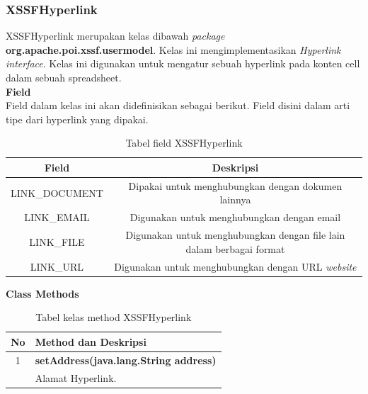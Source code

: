 \subsubsection{XSSFHyperlink}
\label{subs:XSSFHyperlink}
XSSFHyperlink merupakan kelas dibawah \textit{package} \textbf{org.apache.poi.xssf.usermodel}. Kelas ini mengimplementasikan \textit{Hyperlink interface}. Kelas ini digunakan untuk mengatur sebuah hyperlink pada konten cell dalam sebuah spreadsheet.\cite{apachepoi2}
\\
\noindent \textbf{Field}\\
Field dalam kelas ini akan didefinisikan sebagai berikut. Field disini dalam arti tipe dari hyperlink yang dipakai.
\begin{table}[H]
		\centering
		\caption{Tabel field XSSFHyperlink}
		\label{tab:fieldXSSFHyperlink}
\begin{tabular}{|c|c|}
		\hline
		\textbf{Field} & \textbf{Deskripsi} \\ \hline \hline
		LINK\_DOCUMENT & Dipakai untuk menghubungkan dengan dokumen lainnya\\ \hline 
		LINK\_EMAIL &	Digunakan untuk menghubungkan dengan email\\ \hline 
		LINK\_FILE & Digunakan untuk menghubungkan dengan file lain dalam berbagai format \\ \hline
		LINK\_URL	&	Digunakan untuk menghubungkan dengan URL \textit{website}\\ \hline
	\end{tabular}
\end{table}

	\noindent \textbf{Class Methods}
	\begin{table}[H]
		\centering
		\caption{Tabel kelas method XSSFHyperlink}
		\label{tab:methodXSSFHyperlink}
	\begin{tabular}{|c|p{12cm}|}
		\hline
		\textbf{No} & \textbf{Method dan Deskripsi} \\ \hline \hline
		1 & \textbf{setAddress(java.lang.String address)}\\
			&	Alamat Hyperlink.\\ \hline
	\end{tabular}
\end{table}

